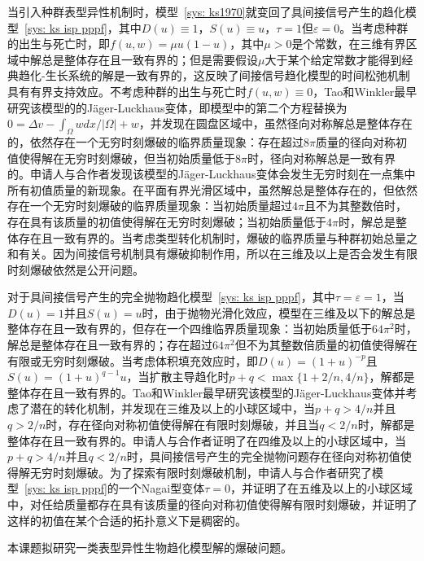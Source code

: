 \documentclass[12pt]{article}
\begin{document}
当引入种群表型异性机制时，模型~\eqref{sys: ks1970}就变回了具间接信号产生的趋化模型~\eqref{sys: ks isp pppf}，其中$D(u)\equiv1$，$S(u)\equiv u$，$\tau=1$但$\varepsilon=0$。当考虑种群的出生与死亡时，即$f(u,w)=\mu u(1-u)$，其中$\mu>0$是个常数，在三维有界区域中解总是整体存在且一致有界的；但是需要假设$\mu$大于某个给定常数才能得到经典趋化-生长系统的解是一致有界的，这反映了间接信号趋化模型的时间松弛机制具有有界支持效应。不考虑种群的出生与死亡时$f(u,w)\equiv0$，Tao和Winkler最早研究该模型的的J\"ager-Luckhaus变体，即模型中的第二个方程替换为$0 = \Delta v  - \int_\Omega w dx/|\Omega| + w$，并发现在圆盘区域中，虽然径向对称解总是整体存在的，依然存在一个无穷时刻爆破的临界质量现象：存在超过$8\pi$质量的径向对称初值使得解在无穷时刻爆破，但当初始质量低于$8\pi$时，径向对称解总是一致有界的。申请人与合作者发现该模型的J\"ager-Luckhaus变体会发生无穷时刻在一点集中所有初值质量的新现象。在平面有界光滑区域中，虽然解总是整体存在的，但依然存在一个无穷时刻爆破的临界质量现象：当初始质量超过$4\pi$且不为其整数倍时，存在具有该质量的初值使得解在无穷时刻爆破；当初始质量低于$4\pi$时，解总是整体存在且一致有界的。当考虑类型转化机制时，爆破的临界质量与种群初始总量之和有关。因为间接信号机制具有爆破抑制作用，所以在三维及以上是否会发生有限时刻爆破依然是公开问题。

对于具间接信号产生的完全抛物趋化模型~\eqref{sys: ks isp pppf}，其中$\tau=\varepsilon=1$，当$D(u)=1$并且$S(u)=u$时，由于抛物光滑化效应，模型在三维及以下的解总是整体存在且一致有界的，但存在一个四维临界质量现象：当初始质量低于$64\pi^2$时，解总是整体存在且一致有界的；存在超过$64\pi^2$但不为其整数倍质量的初值使得解在有限或无穷时刻爆破。当考虑体积填充效应时，即$D(u)=(1+u)^{-p}$且$S(u)=(1+u)^{q-1}u$，当扩散主导趋化时$p+q<\max\{1+2/n,4/n\}$，解都是整体存在且一致有界的。Tao和Winkler最早研究该模型的J\"ager-Luckhaus变体并考虑了潜在的转化机制，并发现在三维及以上的小球区域中，当$p+q>4/n$并且$q>2/n$时，存在径向对称初值使得解在有限时刻爆破，并且当$q<2/n$时，解都是整体存在且一致有界的。申请人与合作者证明了在四维及以上的小球区域中，当$p+q>4/n$并且$q<2/n$时，具间接信号产生的完全抛物问题存在径向对称初值使得解无穷时刻爆破。为了探索有限时刻爆破机制，申请人与合作者研究了模型~\eqref{sys: ks isp pppf}的一个Nagai型变体$\tau=0$，并证明了在五维及以上的小球区域中，对任给质量都存在具有该质量的径向对称初值使得解有限时刻爆破，并证明了这样的初值在某个合适的拓扑意义下是稠密的。


本课题拟研究一类表型异性生物趋化模型解的爆破问题。
\end{document}
